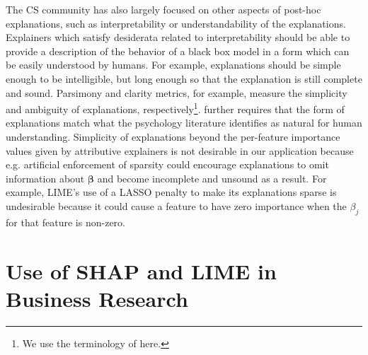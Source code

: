 \documentclass[mnsc,blindrev]{informs3}
\begin{document}
  The CS community has also largely focused on other aspects of post-hoc explanations, such as interpretability or understandability of the explanations.   Explainers which satisfy desiderata related to  interpretability should be able to provide a description of the behavior of a black box model in a form which can be easily understood by humans. For example, explanations should be simple enough to be intelligible, but long enough so that the explanation is still complete and sound. Parsimony \citep{nguyen2020quantitative} and clarity \citep{lakkaraju2017interpretable,montavon2018methods,alvarez18robustness} metrics, for example, measure the simplicity and ambiguity of explanations, respectively\footnote{We use the terminology of \cite{markus2021role} here.}. \cite{jacovi2023diagnosing} further requires that the form of explanations match what the psychology literature identifies as natural for human understanding.  Simplicity of explanations beyond the per-feature importance values given by attributive explainers is not desirable in our application because e.g. artificial enforcement of sparsity could encourage explanations to omit information about $\boldsymbol{\beta}$ and become incomplete and unsound as a result. For example, LIME's use of a LASSO penalty to make its explanations sparse is undesirable because it could cause a feature to have zero importance when the $\beta_j$ for that feature is non-zero. %

    
   
    \section{Use of SHAP and LIME in Business Research}
\end{document}
